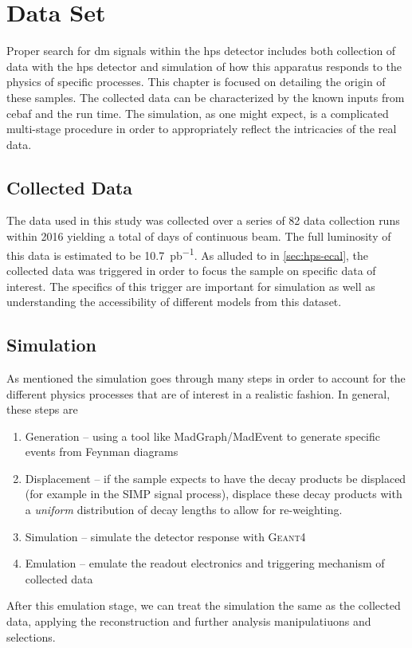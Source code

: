 \chapter{Data Set}
\label{chapter:hps:dataset}

Proper search for \ac{dm} signals within the \ac{hps} detector includes both collection of data
with the \ac{hps} detector and simulation of how this apparatus responds to the physics of specific
processes. This chapter is focused on detailing the origin of these samples. The collected data can
be characterized by the known inputs from \ac{cebaf} and the run time. The simulation, as one might
expect, is a complicated multi-stage procedure in order to appropriately reflect the intricacies of
the real data.

\section{Collected Data} \label{sec:hps:data}
The data used in this study was collected over a series of 82 data collection runs within 2016
yielding a total of  days of
continuous beam. The full luminosity of this data is estimated to be \qty{10.7}{pb^{-1}}. As
alluded to in \cref{sec:hps-ecal}, the collected data was triggered in order to focus the sample on
specific data of interest. The specifics of this trigger are important for simulation as well as
understanding the accessibility of different models from this dataset. 

\section{Simulation} \label{sec:hps:sim}
As mentioned the simulation goes through many steps in order to account for the different physics
processes that are of interest in a realistic fashion. In general, these steps are
\begin{enumerate}
  \item Generation -- using a tool like {\sc MadGraph/MadEvent} to generate
        specific events from Feynman diagrams
  \item Displacement -- if the sample expects to have the decay products be displaced (for example in the
        SIMP signal process), displace these decay products with a \emph{uniform} distribution of decay
        lengths to allow for re-weighting.
  \item Simulation -- simulate the detector response with \textsc{Geant4}\cite{geant4}
  \item Emulation -- emulate the readout electronics and triggering mechanism of collected data
\end{enumerate}
After this emulation stage, we can treat the simulation the same as the collected data,
applying the reconstruction and further analysis manipulatiuons and selections.

